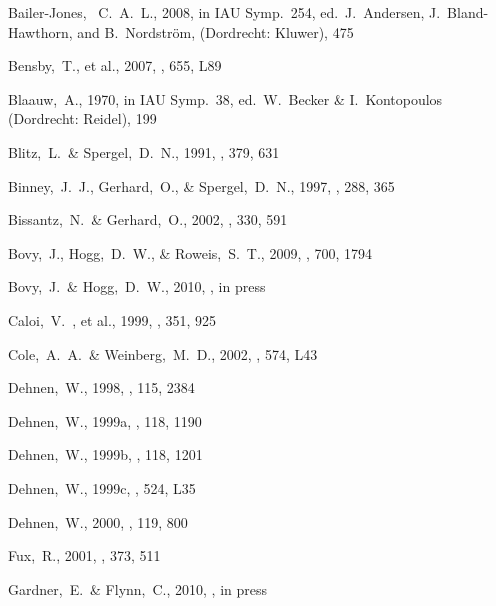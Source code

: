 \documentclass[12pt,preprint]{aastex}
\newcommand{\etal}{et al.}
\begin{document}
\begin{thebibliography}{}


  Bailer-Jones, ~C.~A.~L., 2008,
  in IAU Symp.~254, ed.~J.~Andersen, J.~Bland-Hawthorn, and B.~Nordstr\"{o}m, (Dordrecht: Kluwer), 475  

\bibitem[Bensby \etal(2007)]{Bensby07a}
  Bensby,~T., \etal, 2007,
  \apjl, 655, L89

  Blaauw,~A., 1970, in IAU Symp.~38, ed.~W.~Becker \& I.~Kontopoulos (Dordrecht: Reidel), 199

  Blitz,~L.~\& Spergel,~D.~N., 1991, \apj, 379, 631

  Binney,~J.~J., Gerhard,~O., \& Spergel,~D.~N., 1997,
  \mnras, 288, 365

  Bissantz,~N.~\& Gerhard,~O., 2002,
  \mnras, 330, 591

 Bovy,~J., Hogg,~D.~W., \& Roweis,~S.~T., 2009,
  \apj, 700, 1794

 Bovy,~J.~\& Hogg,~D.~W., 2010,
  \apj, in press

\bibitem[Caloi \etal(1999)]{caloi99a}
  Caloi,~V.~, \etal, 1999,
  \aap, 351, 925

  Cole,~A.~A.~\& Weinberg,~M.~D., 2002,
  \apjl, 574, L43

Dehnen,~W., 1998, \aj, 115, 2384

  Dehnen,~W., 1999a, \aj, 118, 1190

  Dehnen,~W., 1999b, \aj, 118, 1201

  Dehnen,~W., 1999c, \apj, 524, L35

  Dehnen,~W., 2000, \aj, 119, 800

  Fux,~R., 2001,
  \aap, 373, 511

  Gardner,~E.~\& Flynn,~C., 2010,
  \mnras, in press


\end{thebibliography}
\end{document}
